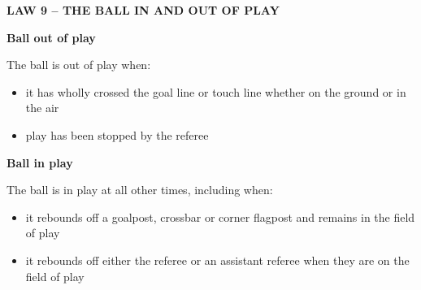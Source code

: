 \clearpage
\sffamily
{\bfseries\color[rgb]{0.4,0.4,0.4}
LAW 9 -- THE BALL IN AND OUT OF PLAY}

\bigskip

{\bfseries Ball out of play}

\headlinebox

The ball is out of play when:

\begin{itemize}
\item it has wholly crossed the goal line or touch line whether on the ground or in the air
\item play has been stopped by the referee
\end{itemize}

{\bfseries Ball in play }

\headlinebox

The ball is in play at all other times, including when:

\begin{itemize}
\item it rebounds off a goalpost, crossbar or corner flagpost and remains in the field of play
\item it rebounds off either the referee or an assistant referee when they are on the field of play
\end{itemize}